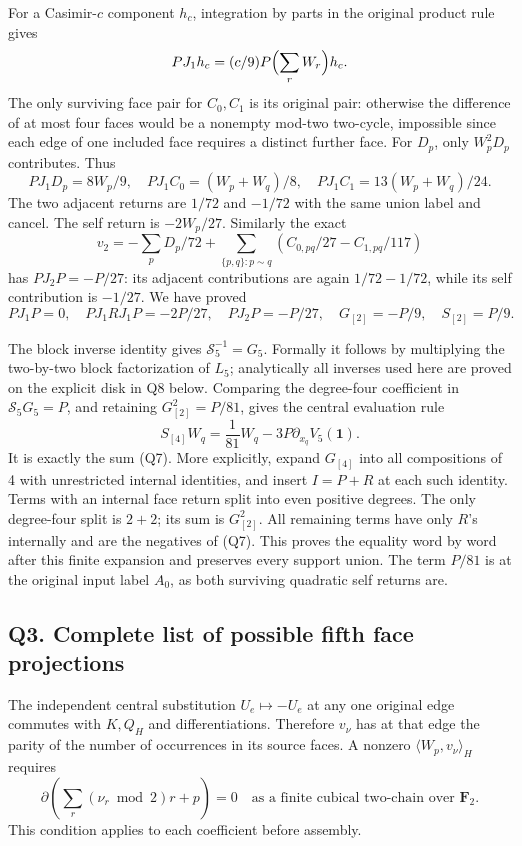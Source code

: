 \documentclass[11pt]{article}
\begin{document}
For a Casimir-\(c\) component \(h_c\), integration by parts in the original product rule gives
\[
 PJ_1h_c=(c/9)P\Bigl(\sum_rW_r\Bigr)h_c.
\]
The only surviving face pair for \(C_0,C_1\) is its original pair: otherwise the difference of at most four faces would be a nonempty mod-two two-cycle, impossible since each edge of one included face requires a distinct further face. For \(D_p\), only \(W_p^2D_p\) contributes. Thus
\[
 PJ_1D_p=8W_p/9,\quad
 PJ_1C_0=(W_p+W_q)/8,\quad
 PJ_1C_1=13(W_p+W_q)/24.
\]
The two adjacent returns are \(1/72\) and \(-1/72\) with the same union label and cancel. The self return is \(-2W_p/27\). Similarly the exact
\[
 v_2=-\sum_pD_p/72+
       \sum_{\{p,q\}:p\sim q}(C_{0,pq}/27-C_{1,pq}/117)
\]
has \(PJ_2P=-P/27\): its adjacent contributions are again \(1/72-1/72\), while its self contribution is \(-1/27\). We have proved
\[
 PJ_1P=0,\quad PJ_1RJ_1P=-2P/27,\quad PJ_2P=-P/27,\quad
 G_{[2]}=-P/9,\quad S_{[2]}=P/9.
 \tag{Q15}
\]

The block inverse identity gives \(\mathscr S_5^{-1}=G_5\). Formally it follows by multiplying the two-by-two block factorization of \(L_5\); analytically all inverses used here are proved on the explicit disk in Q8 below. Comparing the degree-four coefficient in \(\mathscr S_5G_5=P\), and retaining \(G_{[2]}^2=P/81\), gives the central evaluation rule
\[
 \boxed{S_{[4]}W_q=\frac1{81}W_q-3P\partial_{x_q}V_5(\mathbf1).}
 \tag{Q16}
\]
It is exactly the sum (Q7). More explicitly, expand \(G_{[4]}\) into all compositions of 4 with unrestricted internal identities, and insert \(I=P+R\) at each such identity. Terms with an internal face return split into even positive degrees. The only degree-four split is \(2+2\); its sum is \(G_{[2]}^2\). All remaining terms have only \(R\)'s internally and are the negatives of (Q7). This proves the equality word by word after this finite expansion and preserves every support union. The term \(P/81\) is at the original input label \(A_0\), as both surviving quadratic self returns are.

\subsection*{Q3. Complete list of possible fifth face projections}

The independent central substitution \(U_e\mapsto -U_e\) at any one original edge commutes with \(K,Q_H\) and differentiations. Therefore \(v_\nu\) has at that edge the parity of the number of occurrences in its source faces. A nonzero \(\langle W_p,v_\nu\rangle_H\) requires
\[
 \partial\!\left(\sum_r(\nu_r\bmod2)r+p\right)=0
 \quad\text{as a finite cubical two-chain over }\mathbf F_2.
 \tag{Q17}
\]
This condition applies to each coefficient before assembly.
\end{document}
